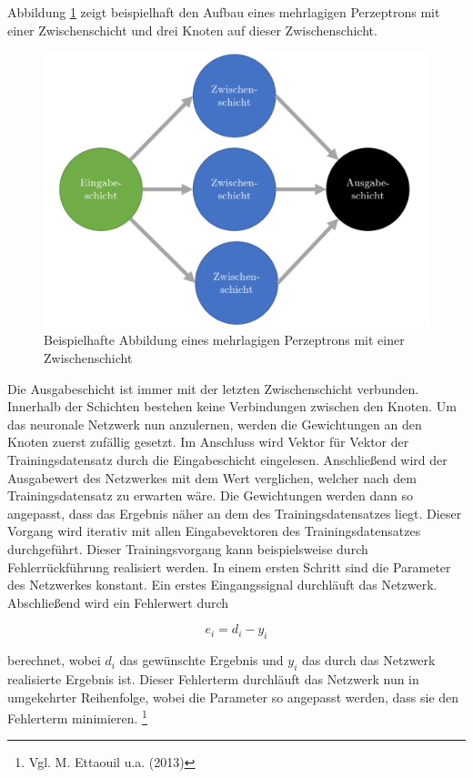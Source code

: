 \documentclass[a4paper,12pt]{article}
\begin{document}
Abbildung \ref{mlp} zeigt beispielhaft den Aufbau eines mehrlagigen Perzeptrons mit einer Zwischenschicht und drei Knoten auf dieser Zwischenschicht. 


\begin{figure}[ht]
\centering
\includegraphics[scale=0.7] {mlp}
\caption[Beispielhafte Abbildung eines mehrlagigen Perzeptrons mit einer Zwischenschicht]{Beispielhafte Abbildung eines mehrlagigen Perzeptrons mit einer Zwischenschicht}
\label{mlp}
\end{figure}

Die Ausgabeschicht ist immer mit der letzten Zwischenschicht verbunden. Innerhalb der Schichten bestehen keine Verbindungen zwischen den Knoten. 
Um das neuronale Netzwerk nun anzulernen, werden die Gewichtungen an den Knoten zuerst zufällig gesetzt. Im Anschluss wird Vektor für Vektor der Trainingsdatensatz durch die Eingabeschicht eingelesen. Anschließend wird der Ausgabewert des Netzwerkes mit dem Wert verglichen, welcher nach dem Trainingsdatensatz zu erwarten wäre. Die Gewichtungen werden dann so angepasst, dass das Ergebnis näher an dem des Trainingsdatensatzes liegt. Dieser Vorgang wird iterativ mit allen Eingabevektoren des Trainingsdatensatzes durchgeführt. 
Dieser Trainingsvorgang kann beispielsweise durch Fehlerrückführung realisiert werden. In einem ersten Schritt sind die Parameter des Netzwerkes konstant. Ein erstes Eingangssignal durchläuft das Netzwerk. Abschließend wird ein Fehlerwert durch 

\begin{equation}
e_i=d_i-y_i
\end{equation}

berechnet, wobei $d_i$ das gewünschte Ergebnis und $y_i$ das durch das Netzwerk realisierte Ergebnis ist. Dieser Fehlerterm durchläuft das Netzwerk nun in umgekehrter Reihenfolge, wobei die Parameter so angepasst werden, dass sie den Fehlerterm minimieren. \footnote{Vgl. M. Ettaouil u.a. (2013)}
\end{document}
